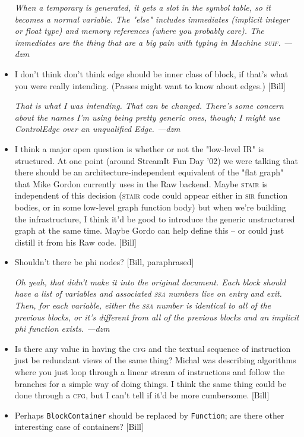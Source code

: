 \documentclass[11pt]{article}
\def\class#1{\texttt{#1}}
\def\cfg{\textsc{cfg}}
\def\sir{\textsc{sir}}
\def\ssa{\textsc{ssa}}
\def\stair{\textsc{stair}}
\def\suif{\textsc{suif}}
\def\machsuif{Machine \suif}
\begin{document}
\begin{itemize}
  \emph{When a temporary is generated, it gets a slot in the symbol
    table, so it becomes a normal variable.  The "else" includes
    immediates (implicit integer or float type) and memory references
    (where you probably care).  The immediates are the thing that are
    a big pain with typing in \machsuif.  ---dzm}
  
\item I don't think don't think edge should be inner class of block,
  if that's what you were really intending.  (Passes might want to
  know about edges.)  [Bill]
  
  \emph{That is what I was intending.  That can be changed.  There's
    some concern about the names I'm using being pretty generic ones,
    though; I might use ControlEdge over an unqualified Edge.  ---dzm}
  
\item I think a major open question is whether or not the "low-level
  IR" is structured.  At one point (around StreamIt Fun Day '02) we
  were talking that there should be an architecture-independent
  equivalent of the "flat graph" that Mike Gordon currently uses in
  the Raw backend.  Maybe \stair{} is independent of this decision
  (\stair{} code could appear either in \sir{} function bodies, or in
  some low-level graph function body) but when we're building the
  infrastructure, I think it'd be good to introduce the generic
  unstructured graph at the same time.  Maybe Gordo can help define
  this -- or could just distill it from his Raw code.  [Bill]

\item Shouldn't there be phi nodes?  [Bill, paraphrased]

  \emph{Oh yeah, that didn't make it into the original document.  Each
    block should have a list of variables and associated \ssa{}
    numbers live on entry and exit.  Then, for each variable, either
    the \ssa{} number is identical to all of the previous blocks, or
    it's different from all of the previous blocks and an implicit phi
    function exists.  ---dzm}
  
\item Is there any value in having the \cfg{} and the textual sequence
  of instruction just be redundant views of the same thing?  Michal
  was describing algorithms where you just loop through a linear
  stream of instructions and follow the branches for a simple way of
  doing things.  I think the same thing could be done through a \cfg,
  but I can't tell if it'd be more cumbersome.  [Bill]
  
\item Perhaps \class{BlockContainer} should be replaced by
  \class{Function}; are there other interesting case of containers?
  [Bill]

\end{itemize}
\end{document}
